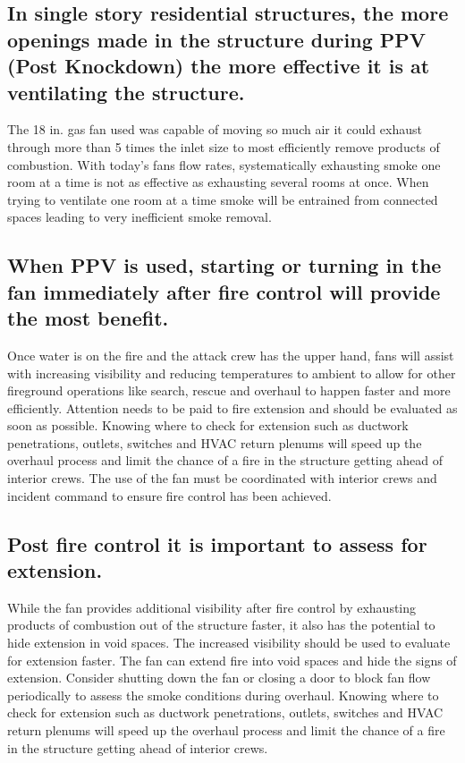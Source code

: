 \documentclass{article}
\begin{document}
\subsection{In single story residential structures, the more openings made in the structure during PPV (Post Knockdown) the more effective it is at ventilating the structure.}
The 18 in. gas fan used was capable of moving so much air it could exhaust through more than 5 times the inlet size to most efficiently remove products of combustion. With today’s fans flow rates, systematically exhausting smoke one room at a time is not as effective as exhausting several rooms at once.   When trying to ventilate one room at a time smoke will be entrained from connected spaces leading to very inefficient smoke removal.  

\subsection{When PPV is used, starting or turning in the fan immediately after fire control will provide the most benefit.}  Once water is on the fire and the attack crew has the upper hand, fans will assist with increasing visibility and reducing temperatures to ambient to allow for other fireground operations like search, rescue and overhaul to happen faster and more efficiently.  Attention needs to be paid to fire extension and should be evaluated as soon as possible.  Knowing where to check for extension such as ductwork penetrations, outlets, switches and HVAC return plenums will speed up the overhaul process and limit the chance of a fire in the structure getting ahead of interior crews.  The use of the fan must be coordinated with interior crews and incident command to ensure fire control has been achieved.  

\subsection{Post fire control it is important to assess for extension.}
While the fan provides additional visibility after fire control by exhausting products of combustion out of the structure faster, it also has the potential to hide extension in void spaces. The increased visibility should be used to evaluate for extension faster.  The fan can extend fire into void spaces and hide the signs of extension.  Consider shutting down the fan or closing a door to block fan flow periodically to assess the smoke conditions during overhaul.  Knowing where to check for extension such as ductwork penetrations, outlets, switches and HVAC return plenums will speed up the overhaul process and limit the chance of a fire in the structure getting ahead of interior crews.  
\end{document}

